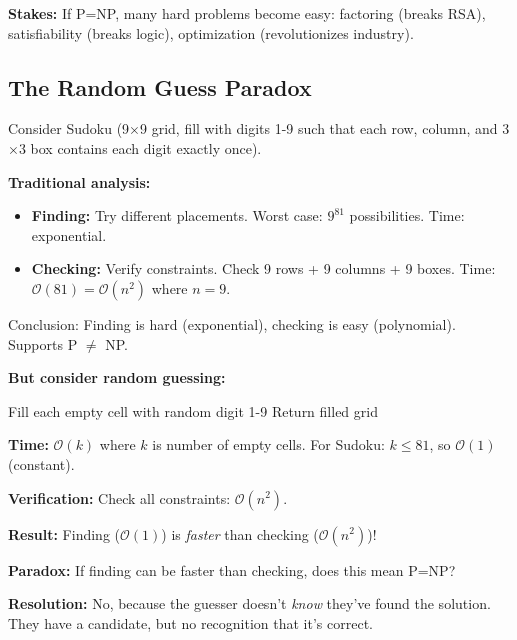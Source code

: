 \documentclass[twocolumn,10pt]{article}
\theoremstyle{definition}
\theoremstyle{remark}
\newcommand{\bigO}{\mathcal{O}}
\begin{document}
\vspace{0.2cm}
\noindent\textbf{Stakes:} If P=NP, many hard problems become easy: factoring (breaks RSA\cite{rivest1978}), satisfiability (breaks logic), optimization (revolutionizes industry).

\subsection{The Random Guess Paradox}

Consider Sudoku (9$\times$9 grid, fill with digits 1-9 such that each row, column, and 3$\times$3 box contains each digit exactly once).

\vspace{0.2cm}
\noindent\textbf{Traditional analysis:}
\begin{itemize}
\item \textbf{Finding:} Try different placements. Worst case: $9^{81}$ possibilities. Time: exponential.
\item \textbf{Checking:} Verify constraints. Check 9 rows + 9 columns + 9 boxes. Time: $\bigO(81) = \bigO(n^2)$ where $n=9$.
\end{itemize}

Conclusion: Finding is hard (exponential), checking is easy (polynomial). Supports P $\neq$ NP.

\vspace{0.2cm}
\noindent\textbf{But consider random guessing:}

\begin{algorithm}
\caption{Random Guess}
\begin{algorithmic}[1]
\STATE Fill each empty cell with random digit 1-9
\STATE Return filled grid
\end{algorithmic}
\end{algorithm}

\textbf{Time:} $\bigO(k)$ where $k$ is number of empty cells. For Sudoku: $k \leq 81$, so $\bigO(1)$ (constant).

\vspace{0.2cm}
\noindent\textbf{Verification:} Check all constraints: $\bigO(n^2)$.

\vspace{0.2cm}
\noindent\textbf{Result:} Finding ($\bigO(1)$) is \textit{faster} than checking ($\bigO(n^2)$)!

\vspace{0.2cm}
\noindent\textbf{Paradox:} If finding can be faster than checking, does this mean P=NP?

\vspace{0.2cm}
\noindent\textbf{Resolution:} No, because the guesser doesn't \textit{know} they've found the solution. They have a candidate, but no recognition that it's correct.
\end{document}
